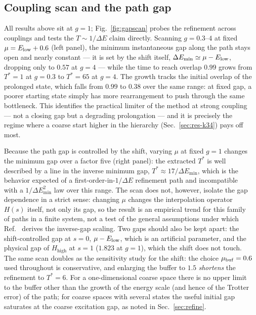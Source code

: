 \documentclass[
  aps,            %
  prc,            %
  reprint,        %
  superscriptaddress,
  floatfix,
  nofootinbib
]{revtex4-2}
\newcommand{\Hhigh}{H_{\mathrm{high}}}
\begin{document}
\subsection{Coupling scan and the path gap}
\label{sec:res-gscan}
All results above sit at $g=1$; Fig.~\ref{fig:gapscan} probes the refinement
across couplings and tests the $T\sim1/\Delta E$ claim directly.  Scanning
$g=0.3$--$4$ at fixed $\mu=E_{\rm low}+0.6$ (left panel), the minimum
instantaneous gap along the path stays open and nearly constant --- it is set by
the shift itself, $\Delta E_{\min}\simeq\mu-E_{\rm low}$, dropping only to
$0.57$ at $g=4$ --- while the time to reach overlap $0.99$ grows from
$T^{*}=1$ at $g=0.3$ to $T^{*}=65$ at $g=4$.  The growth tracks the initial
overlap of the prolonged state, which falls from $0.99$ to $0.38$ over the same
range: at fixed gap, a poorer starting state simply has more rearrangement to
push through the same bottleneck.  This identifies the practical limiter of the
method at strong coupling --- not a closing gap but a degrading prolongation ---
and it is precisely the regime where a coarse start higher in the hierarchy
(Sec.~\ref{sec:res-k34}) pays off most.

Because the path gap is controlled by the shift, varying $\mu$ at fixed $g=1$
changes the minimum gap over a factor five (right panel): the extracted $T^{*}$
is well described by a line in the inverse minimum gap,
$T^{*}\approx17/\Delta E_{\min}$, which is the behavior expected of a
first-order-in-$1/\Delta E$ refinement path and incompatible with a
$1/\Delta E_{\min}^{2}$ law over this range.  The scan does not, however,
isolate the gap dependence in a strict sense: changing $\mu$ changes the
interpolation operator $H(s)$ itself, not only its gap, so the result is an
empirical trend for this family of paths in a finite system, not a test of the
general assumptions under which Ref.~\cite{Bogner2026} derives the inverse-gap
scaling.  Two gaps should also be kept apart: the shift-controlled gap at
$s=0$, $\mu-E_{\rm low}$, which is an artificial parameter, and the physical
gap of $\Hhigh$ at $s=1$ ($1.823$ at $g=1$), which the shift does not touch.
The same scan doubles as the sensitivity study for the shift: the choice
$\mu_{\rm buf}=0.6$ used throughout is conservative, and enlarging the buffer
to $1.5$ \emph{shortens} the refinement to $T^{*}=6$.  For a one-dimensional
coarse space there is no upper limit to the buffer other than the growth of
the energy scale (and hence of the Trotter error) of the path; for coarse
spaces with several states the useful initial gap saturates at the coarse
excitation gap, as noted in Sec.~\ref{sec:refine}.
\end{document}
